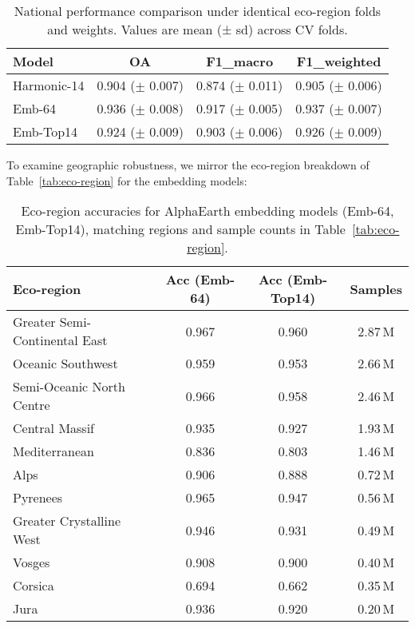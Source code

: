 \documentclass[utf8]{FrontiersinHarvard}
\begin{document}
\begin{table}[H]
    \centering
    \begin{tabular}{lccc}
        \hline
        \textbf{Model} & \textbf{OA} & \textbf{F1\_macro} & \textbf{F1\_weighted} \\ \hline
        Harmonic-14 & 0.904 (\(\pm\) 0.007) & 0.874 (\(\pm\) 0.011) & 0.905 (\(\pm\) 0.006) \\
        Emb-64 & 0.936 (\(\pm\) 0.008) & 0.917 (\(\pm\) 0.005) & 0.937 (\(\pm\) 0.007) \\
        Emb-Top14 & 0.924 (\(\pm\) 0.009) & 0.903 (\(\pm\) 0.006) & 0.926 (\(\pm\) 0.009) \\ \hline
    \end{tabular}
    \caption{National performance comparison under identical eco-region folds and weights. Values are mean (± sd) across CV folds.}
    \label{tab:national_ablation}
\end{table}

To examine geographic robustness, we mirror the eco-region breakdown of Table~\ref{tab:eco-region} for the embedding models:

\begin{table}[H]
\centering
\begin{tabular}{lccc}
\hline
\textbf{Eco-region} & \textbf{Acc (Emb-64)} & \textbf{Acc (Emb-Top14)} & \textbf{Samples} \\ \hline
Greater Semi-Continental East & 0.967 & 0.960 & 2.87\,M \\
Oceanic Southwest & 0.959 & 0.953 & 2.66\,M \\
Semi-Oceanic North Centre & 0.966 & 0.958 & 2.46\,M \\
Central Massif & 0.935 & 0.927 & 1.93\,M \\
Mediterranean & 0.836 & 0.803 & 1.46\,M \\
Alps & 0.906 & 0.888 & 0.72\,M \\
Pyrenees & 0.965 & 0.947 & 0.56\,M \\
Greater Crystalline West & 0.946 & 0.931 & 0.49\,M \\
Vosges & 0.908 & 0.900 & 0.40\,M \\
Corsica & 0.694 & 0.662 & 0.35\,M \\
Jura & 0.936 & 0.920 & 0.20\,M \\ \hline
\end{tabular}
\caption{Eco-region accuracies for AlphaEarth embedding models (Emb-64, Emb-Top14), matching regions and sample counts in Table~\ref{tab:eco-region}.}
\label{tab:eco-region-emb}
\end{table}
\end{document}

